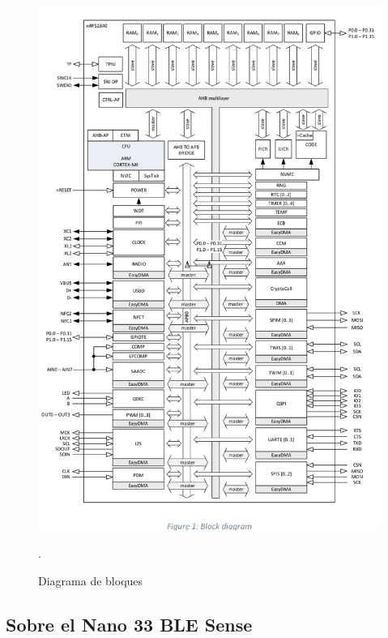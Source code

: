 \begin{figure}[H]
\centering
\includegraphics[scale=0.6]{./images/bloques.png} 
\caption{Diagrama de bloques \cite{mcu}}.
\label{f3}
\end{figure}

\subsection{Sobre el Nano 33 BLE Sense}

